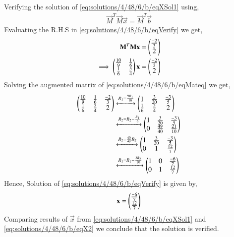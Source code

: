 Verifying the solution of \eqref{eq:solutions/4/48/6/b/eqXSol1} using,
\begin{align}
\vec{M}^T\vec{M}\vec{x} = \vec{M}^T\vec{b}\label{eq:solutions/4/48/6/b/eqVerify}
\end{align}
Evaluating the R.H.S in \eqref{eq:solutions/4/48/6/b/eqVerify} we get,
\begin{align}
\mathbf{M}^T\mathbf{M}\mathbf{x} &= \begin{pmatrix}\frac{-2}{3}\\ 2\end{pmatrix}\\
\implies\begin{pmatrix}\frac{10}{9}&\frac{1}{6}\\\frac{1}{6}&\frac{5}{4}\end{pmatrix}\mathbf{x} &= \begin{pmatrix}\frac{-2}{3}\\2\end{pmatrix}\label{eq:solutions/4/48/6/b/eqMateq}
\end{align}
Solving the augmented matrix of \eqref{eq:solutions/4/48/6/b/eqMateq} we get,
\begin{align}
\begin{pmatrix}\frac{10}{9}&\frac{1}{6}& \frac{-2}{3}\\\frac{1}{6}&\frac{5}{4}& 2\end{pmatrix} &\xleftrightarrow{R_1=\frac{9R_1}{10}}\begin{pmatrix}1&\frac{3}{20}&\frac{-3}{5}\\\frac{1}{6}&\frac{5}{4}&2\end{pmatrix}\\
&\xleftrightarrow{R_2=R_2-\frac{R_1}{6}}\begin{pmatrix}1&\frac{3}{20}&\frac{-3}{5}\\0&\frac{49}{40}&\frac{21}{10}\end{pmatrix}\\
&\xleftrightarrow{R_2=\frac{40}{49}R_2}\begin{pmatrix}1&\frac{3}{20}&\frac{-3}{5}\\0&1&\frac{12}{7}\end{pmatrix}\\
&\xleftrightarrow{R_1=R_1-\frac{3R_2}{20}}\begin{pmatrix}1&0&\frac{-6}{7}\\0&1&\frac{12}{7}\end{pmatrix}
\end{align}
Hence, Solution of \eqref{eq:solutions/4/48/6/b/eqVerify} is given by,
\begin{align}
\mathbf{x}=\begin{pmatrix}\frac{-6}{7}\\\frac{12}{7}\end{pmatrix}\label{eq:solutions/4/48/6/b/eqX2}
\end{align}
Comparing results of $\vec{x}$ from \eqref{eq:solutions/4/48/6/b/eqXSol1} and \eqref{eq:solutions/4/48/6/b/eqX2} we conclude that the solution is verified.
